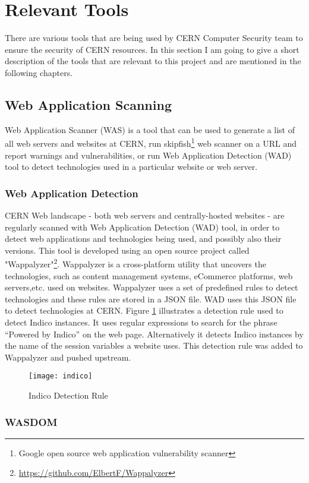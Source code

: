 \section{Relevant Tools}
\label{sec:tools}
There are various tools that are being used by CERN Computer Security team to ensure the security of CERN resources. In this section I am going to give a short description of the tools that are relevant to this project and are mentioned in the following chapters. 
\subsection{Web Application Scanning} 
Web Application Scanner (WAS) is a tool that can be used to generate a list of all web servers and websites at CERN, run skipfish\footnote{Google open source web application vulnerability scanner} web scanner on a URL and report warnings and vulnerabilities, or run Web Application Detection (WAD) tool to detect technologies used in a particular website or web server.
\subsubsection{Web Application Detection}
CERN Web landscape - both web servers and centrally-hosted websites - are regularly scanned with Web Application Detection (WAD) tool, in order to detect web applications and technologies being used, and possibly also their versions. This tool is developed using an open source project called "Wappalyzer"\footnote{\url{https://github.com/ElbertF/Wappalyzer}}. Wappalyzer is a cross-platform utility that uncovers the technologies, such as content management systems, eCommerce platforms, web servers,etc. used on websites.  Wappalyzer uses a set of predefined rules to detect technologies and these rules are stored in a JSON file. WAD uses this JSON file to detect technologies at CERN. Figure \ref{figure:indico} illustrates a detection rule used to detect Indico instances. It uses regular expressions to search for the phrase ``Powered by Indico'' on the web page. Alternatively it detects Indico instances by the name of the session variables a website uses. This detection rule was added to Wappalyzer and pushed upstream.
\begin{figure}[h!]
\label{figure:indico}
  \centering
    \texttt{[image: indico]}
  \caption{Indico Detection Rule}
  
\end{figure}
 
\subsubsection{WASDOM}

